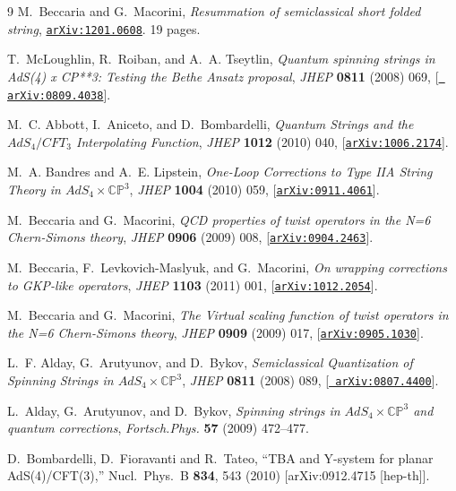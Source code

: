 \documentclass[a4paper,11pt]{article}
\numberwithin{equation}{section}
\begin{document}
\begin{thebibliography} {9}
M.~Beccaria and G.~Macorini, {\it {Resummation of semiclassical short folded
  string}},  \href{http://xxx.lanl.gov/abs/1201.0608}{{\tt arXiv:1201.0608}}.
  19 pages.

T.~McLoughlin, R.~Roiban, and A.~A. Tseytlin, {\it {Quantum spinning strings in
  AdS(4) x CP**3: Testing the Bethe Ansatz proposal}},  {\em JHEP} {\bf 0811}
  (2008) 069, [\href{http://xxx.lanl.gov/abs/0809.4038}{{\tt
  arXiv:0809.4038}}].

M.~C. Abbott, I.~Aniceto, and D.~Bombardelli, {\it {Quantum Strings and the
  $AdS_4/CFT_3$ Interpolating Function}},  {\em JHEP} {\bf 1012} (2010) 040,
  [\href{http://xxx.lanl.gov/abs/1006.2174}{{\tt arXiv:1006.2174}}].

M.~A. Bandres and A.~E. Lipstein, {\it {One-Loop Corrections to Type IIA String
  Theory in $AdS_{4}\times\mathbb{CP}^{3}$}},  {\em JHEP} {\bf 1004} (2010)
  059, [\href{http://xxx.lanl.gov/abs/0911.4061}{{\tt arXiv:0911.4061}}].

M.~Beccaria and G.~Macorini, {\it {QCD properties of twist operators in the N=6
  Chern-Simons theory}},  {\em JHEP} {\bf 0906} (2009) 008,
  [\href{http://xxx.lanl.gov/abs/0904.2463}{{\tt arXiv:0904.2463}}].

M.~Beccaria, F.~Levkovich-Maslyuk, and G.~Macorini, {\it {On wrapping
  corrections to GKP-like operators}},  {\em JHEP} {\bf 1103} (2011) 001,
  [\href{http://xxx.lanl.gov/abs/1012.2054}{{\tt arXiv:1012.2054}}].

M.~Beccaria and G.~Macorini, {\it {The Virtual scaling function of twist
  operators in the N=6 Chern-Simons theory}},  {\em JHEP} {\bf 0909} (2009)
  017, [\href{http://xxx.lanl.gov/abs/0905.1030}{{\tt arXiv:0905.1030}}].

L.~F. Alday, G.~Arutyunov, and D.~Bykov, {\it {Semiclassical Quantization of
  Spinning Strings in $AdS_{4}\times \mathbb{CP}^{3}$}},  {\em JHEP} {\bf 0811}
  (2008) 089, [\href{http://xxx.lanl.gov/abs/0807.4400}{{\tt
  arXiv:0807.4400}}].

L.~Alday, G.~Arutyunov, and D.~Bykov, {\it {Spinning strings in $AdS_{4}\times
  \mathbb{CP}^{3}$ and quantum corrections}},  {\em Fortsch.Phys.} {\bf 57}
  (2009) 472--477.

  D.~Bombardelli, D.~Fioravanti and R.~Tateo,
  ``TBA and Y-system for planar AdS(4)/CFT(3),''
  Nucl.\ Phys.\ B {\bf 834}, 543 (2010)
  [arXiv:0912.4715 [hep-th]].


\end{thebibliography}
\end{document}
